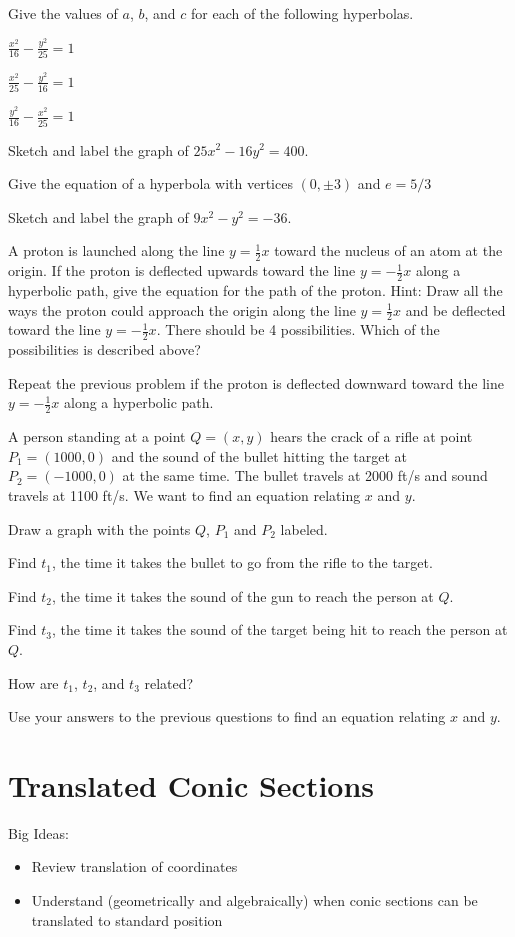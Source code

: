 \bq Give the values of $a$, $b$, and $c$ for each of the following hyperbolas.
\be
\item $\frac{x^2}{16}-\frac{y^2}{25}=1$
\item $\frac{x^2}{25}-\frac{y^2}{16}=1$
\item $\frac{y^2}{16}-\frac{x^2}{25}=1$
\ee
\eq

\bq Sketch and label the graph of $25x^2-16y^2=400$. \eq

\bq Give the equation of a hyperbola with vertices $(0,\pm3)$ and $e=5/3$ \eq

\bq Sketch and label the graph of $9x^2-y^2=-36$. \eq

\bq  A proton is launched along the line $y = \frac{1}{2} x$ toward the nucleus of an atom at the origin. If the proton is deflected upwards toward the line $y = -\frac{1}{2} x$ along a hyperbolic path, give the equation for the path of the proton. Hint: Draw all the ways the proton could approach the origin along the line $y=\frac{1}{2} x$ and be deflected toward the line $y =-\frac{1}{2} x$\eq. There should be 4 possibilities. Which of the possibilities is described above?

\bq Repeat the previous problem if the proton is deflected downward toward the line $y = -\frac{1}{2} x$ along a hyperbolic path. \eq

\bq A person standing at a point $Q=(x,y)$ hears the crack of a rifle at point $P_1= (1000,0)$ and the sound of the bullet hitting the target at $P_2=(-1000,0)$ at the same time. The bullet travels at 2000 ft/s and sound travels at 1100 ft/s. We want to find an equation relating $x$ and $y$.
\be
\item Draw a graph with the points $Q$, $P_1$ and $P_2$ labeled.
\item Find $t_1$, the time it takes the bullet to go from the rifle to the target.
\item Find $t_2$, the time it takes the sound of the gun to reach the person at $Q$.
\item Find $t_3$, the time it takes the sound of the target being hit to reach the person at $Q$.
\item How are $t_1$, $t_2$, and $t_3$ related?
\item Use your answers to the previous questions to find an equation relating $x$ and $y$.
\ee
\eq

\section{Translated Conic Sections}
Big Ideas:
\begin{itemize}
\item Review translation of coordinates
\item Understand (geometrically and algebraically) when conic sections can be translated to standard position
\end{itemize}

